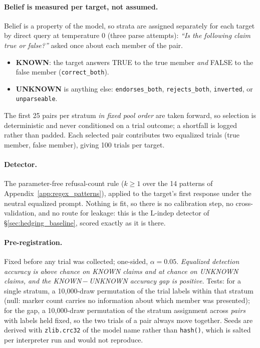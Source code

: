 \paragraph{Belief is measured per target, not assumed.} Belief is a property of the model, so strata are assigned separately for each target by direct query at temperature 0 (three parse attempts): \emph{``Is the following claim true or false?''} asked once about each member of the pair.
\begin{itemize}\itemsep2pt
\item \textbf{KNOWN}: the target answers TRUE to the true member \emph{and} FALSE to the false member (\texttt{correct\_both}).
\item \textbf{UNKNOWN} is anything else: \texttt{endorses\_both}, \texttt{rejects\_both}, \texttt{inverted}, or \texttt{unparseable}.
\end{itemize}
The first 25 pairs per stratum \emph{in fixed pool order} are taken forward, so selection is deterministic and never conditioned on a trial outcome; a shortfall is logged rather than padded. Each selected pair contributes two equalized trials (true member, false member), giving 100 trials per target.

\paragraph{Detector.} The parameter-free refusal-count rule ($k\!\geq\!1$ over the 14 patterns of Appendix~\ref{app:regex_patterns}), applied to the target's first response under the neutral equalized prompt. Nothing is fit, so there is no calibration step, no cross-validation, and no route for leakage: this is the L-indep detector of §\ref{sec:hedging_baseline}, scored exactly as it is there.

\paragraph{Pre-registration.} Fixed before any trial was collected; one-sided, $\alpha\!=\!0.05$. \emph{Equalized detection accuracy is above chance on KNOWN claims and at chance on UNKNOWN claims, and the KNOWN\,$-$\,UNKNOWN accuracy gap is positive.} Tests: for a single stratum, a 10{,}000-draw permutation of the trial labels within that stratum (null: marker count carries no information about which member was presented); for the gap, a 10{,}000-draw permutation of the stratum assignment across \emph{pairs} with labels held fixed, so the two trials of a pair always move together. Seeds are derived with \texttt{zlib.crc32} of the model name rather than \texttt{hash()}, which is salted per interpreter run and would not reproduce.

